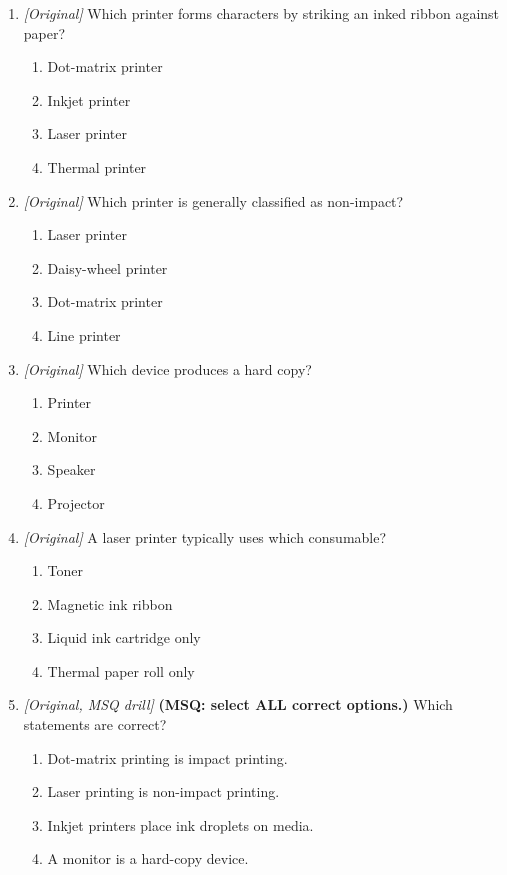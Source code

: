 \begin{enumerate}[label=\textbf{Q\arabic*.}, leftmargin=*]
\begin{enumerate}[label=\Alph*.]
    \item Dot-matrix printers use a laser beam to form characters.
  \end{enumerate}
\item \textit{[Original]} Which printer forms characters by striking an inked ribbon against paper?
  \begin{enumerate}[label=\Alph*.]
\item Dot-matrix printer
   \item Inkjet printer
   \item Laser printer
   \item Thermal printer
  \end{enumerate}

\item \textit{[Original]} Which printer is generally classified as non-impact?
  \begin{enumerate}[label=\Alph*.]
\item Laser printer
   \item Daisy-wheel printer
   \item Dot-matrix printer
   \item Line printer
  \end{enumerate}

\item \textit{[Original]} Which device produces a hard copy?
  \begin{enumerate}[label=\Alph*.]
\item Printer
   \item Monitor
   \item Speaker
   \item Projector
  \end{enumerate}

\item \textit{[Original]} A laser printer typically uses which consumable?
  \begin{enumerate}[label=\Alph*.]
\item Toner
   \item Magnetic ink ribbon
   \item Liquid ink cartridge only
   \item Thermal paper roll only
  \end{enumerate}

\item \textit{[Original, MSQ drill]} \textbf{(MSQ: select ALL correct options.)} Which statements are correct?
  \begin{enumerate}[label=\Alph*.]
\item Dot-matrix printing is impact printing.
   \item Laser printing is non-impact printing.
   \item Inkjet printers place ink droplets on media.
   \item A monitor is a hard-copy device.
  \end{enumerate}

\end{enumerate}
